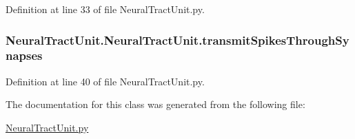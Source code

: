 Definition at line 33 of file Neural\-Tract\-Unit.\-py.

\hypertarget{class_neural_tract_unit_1_1_neural_tract_unit_ac6fa367f6ada8045919674feaed4f6ad}{
\subsubsection[{transmit\-Spikes\-Through\-Synapses}]{\setlength{\rightskip}{0pt plus 5cm}Neural\-Tract\-Unit.\-Neural\-Tract\-Unit.\-transmit\-Spikes\-Through\-Synapses}}\label{class_neural_tract_unit_1_1_neural_tract_unit_ac6fa367f6ada8045919674feaed4f6ad}


Definition at line 40 of file Neural\-Tract\-Unit.\-py.



The documentation for this class was generated from the following file\-:\begin{DoxyCompactItemize}
\item 
\hyperlink{_neural_tract_unit_8py}{Neural\-Tract\-Unit.\-py}\end{DoxyCompactItemize}
